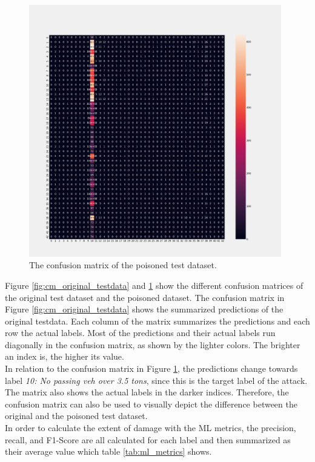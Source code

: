 \begin{figure}[ht!]
  \centering
  \includegraphics[width=11cm]{pictures/cm_poisoned_testdata.png}
  \caption{The confusion matrix of the poisoned test dataset.}
  \label{fig:cm_poisoned_testdata}
\end{figure}

Figure \ref{fig:cm_original_testdata} and \ref{fig:cm_poisoned_testdata} show the different confusion matrices of the original test dataset and the poisoned dataset. The confusion matrix in Figure \ref{fig:cm_original_testdata} shows the summarized predictions of the original testdata. Each column of the matrix summarizes the predictions and each row the actual labels. Most of the predictions and their actual labels run diagonally in the confusion matrix, as shown by the lighter colors. The brighter an index is, the higher its value. \\
In relation to the confusion matrix in Figure \ref{fig:cm_poisoned_testdata}, the predictions change towards label \textit{10: No passing veh over 3.5 tons}, since this is the target label of the attack. The matrix also shows the actual labels in the darker indices. Therefore, the confusion matrix can also be used to visually depict the difference between the original and the poisoned test dataset. \\
In order to calculate the extent of damage with the ML metrics, the precision, recall, and F1-Score are all calculated for each label and then summarized as their average value which table \ref{tab:ml_metrics} shows.

